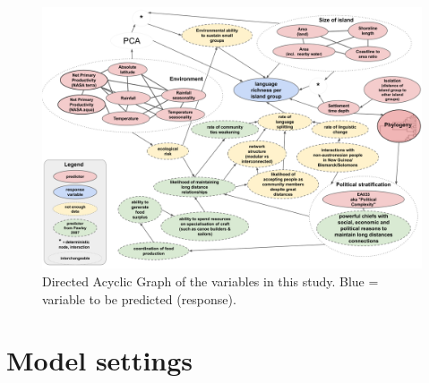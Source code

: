 \documentclass[unnumsec,webpdf,modern,medium]{oup-authoring-template}
\begin{document}
\begin{appendices}



\begin{figure} 

\includegraphics[width=\textwidth]{Predicting_lgs_DAG_full.png}
\caption{Directed Acyclic Graph of the variables in this study. Blue = variable to be predicted (response).}
\label{Predicting_lgs_DAG_full}
\end{figure}


\section{Model settings}
\label{appendix_model_settings}
\citep{burkner2017brms}






\end{appendices}
\end{document}
